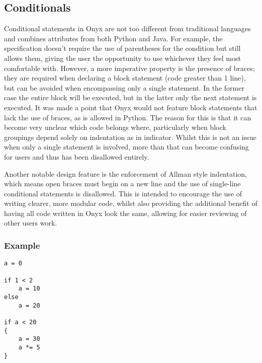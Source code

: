 \documentclass[
]{report}
\begin{document}
\subsection{Conditionals}
Conditional statements in Onyx are not too different from traditional
languages and combines attributes from both Python and Java. For
example, the specification doesn't require the use of parentheses for
the condition but still allows them, giving the user the opportunity to
use whichever they feel most comfortable with. However, a more
imperative property is the presence of braces; they are required when
declaring a block statement (code greater than 1 line), but can be
avoided when encompassing only a single statement. In the former case
the entire block will be executed, but in the latter only the next
statement is executed. It was made a point that Onyx would not feature
block statements that lack the use of braces, as is allowed in Python.
The reason for this is that it can become very unclear which code
belongs where, particularly when block groupings depend solely on
indentation as in indicator. Whilst this is not an issue when only a
single statement is involved, more than that can become confusing for
users and thus has been disallowed entirely.

Another notable design feature is the enforcement of Allman style
indentation, which means open braces must begin on a new line and the
use of single-line conditional statements is disallowed. This is
intended to encourage the use of writing clearer, more modular code,
whilst also providing the additional benefit of having all code written
in Onyx look the same, allowing for easier reviewing of other users
work.

\subsubsection{Example}
\begin{verbatim}
a = 0

if 1 < 2
    a = 10
else
    a = 20

if a < 20
{
    a = 30
    a *= 5
}
\end{verbatim}
\end{document}
